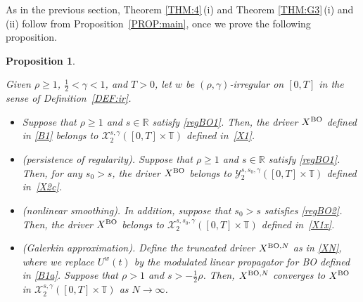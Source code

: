 \documentclass[letterpaper, 11pt,  reqno]{amsart}
\newtheorem{proposition}[theorem]{Proposition}
\newcommand{\1}{\hspace{0.5mm}\text{I}\hspace{0.5mm}}
\newcommand{\R}{\mathbb{R}}
\newcommand{\T}{\mathbb{T}}
\newcommand{\g}{\gamma}
\newcommand{\cX}{\mathcal{X}}
\newcommand{\cY}{\mathcal{Y}}
\newcommand{\uw}{U^w}
\newcommand{\BO}{\text{\rm BO} }
\numberwithin{equation}{section}
\numberwithin{theorem}{section}
\begin{document}
As in the previous section, 
Theorem \ref{THM:4}\,(i) and Theorem \ref{THM:G3}\,(i) and (ii)  follow
from  Proposition~\ref{PROP:main}, 
once we prove the following proposition.



\begin{proposition}

\label{PROP:BO}


Given $\rho \ge1$,  $\frac 12 < \g < 1$, and $T> 0$, 
let  $w$ be $(\rho,\g)$-irregular on $[0, T]$ in the sense of Definition~\ref{DEF:ir}.



\smallskip

\begin{itemize}
\item[(i)]
Suppose that $\rho \ge 1$ and $s \in \R$
satisfy 
\eqref{regBO1}.
Then, 
the driver $X^\BO$ defined in \eqref{B1}
belongs to $ \cX^{s, \g}_2([0, T]\times \T)$
defined in~\eqref{X1}.

\smallskip
\item[(ii)] \textup{(persistence of regularity).}
Suppose that $\rho \ge 1$ and $s \in \R$
satisfy 
\eqref{regBO1}.
Then, 
for any $s_0 > s$, 
the driver $X^\BO$ 
belongs to 
$\cY^{s, s_0, \g}_{2}([0, T]\times \T)$
defined in~\eqref{X2c}.



\smallskip
\item[(iii)]
\textup{(nonlinear smoothing).}
In addition, suppose that $s_0 > s$ satisfies
\eqref{regBO2}.
Then, 
the driver $X^\BO$ 
belongs to 
$\cX^{s, s_0, \g}_{2}([0, T]\times \T)$
defined in~\eqref{X1x}.



\smallskip
\item[(iv)]
\textup{(Galerkin approximation).}
Define the truncated driver $X^{\BO, N}$
as in \eqref{XN}, 
where we replace
 $\uw(t)$ by the modulated linear propagator
for BO defined in \eqref{B1a}.
Suppose that $\rho > 1$ and $s > -\frac 12\rho$.
Then, $X^{\BO, N}$
 converges
to  $X^\BO$ 
in  $ \cX^{s, \g}_2([0, T]\times \T)$ as $N \to \infty$.


\end{itemize}



\end{proposition}
\end{document}
